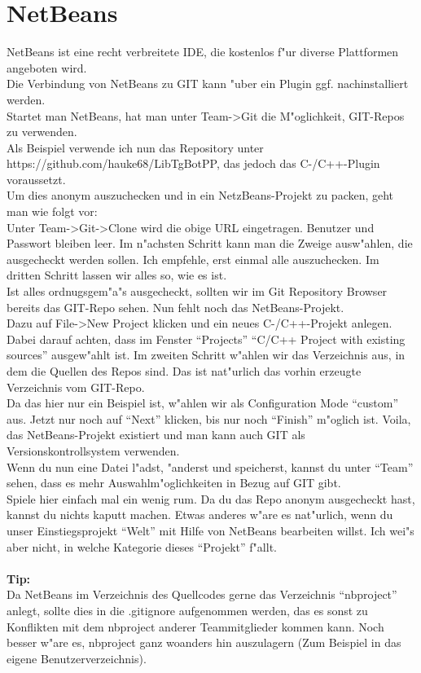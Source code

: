 \documentclass[german,a4paper]{report}
\begin{document}
\section{NetBeans}
NetBeans ist eine recht verbreitete IDE, die kostenlos f"ur diverse
Plattformen angeboten wird.\\
Die Verbindung von NetBeans zu GIT kann "uber ein Plugin ggf.
nachinstalliert werden.\\
Startet man NetBeans, hat man unter Team->Git die M"oglichkeit,
GIT-Repos zu verwenden.\\
Als Beispiel verwende ich nun das Repository unter
https://github.com/hauke68/LibTgBotPP, das jedoch das C-/C++-Plugin
voraussetzt.\\
Um dies anonym auszuchecken und in ein NetzBeans-Projekt zu packen,
geht man wie folgt vor:\\
Unter Team->Git->Clone wird die obige URL eingetragen. Benutzer
und Passwort bleiben leer. Im n"achsten Schritt kann man die
Zweige ausw"ahlen, die ausgecheckt werden sollen. Ich empfehle,
erst einmal alle auszuchecken. Im dritten Schritt lassen wir alles
so, wie es ist.\\
Ist alles ordnugsgem"a"s ausgecheckt, sollten wir im Git Repository
Browser bereits das GIT-Repo sehen. Nun fehlt noch das NetBeans-Projekt.\\
Dazu auf File->New Project klicken und ein neues C-/C++-Projekt anlegen.
Dabei darauf achten, dass im Fenster ``Projects'' ``C/C++ Project with
existing sources'' ausgew"ahlt ist. Im zweiten Schritt w"ahlen wir
das Verzeichnis aus, in dem die Quellen des Repos sind. Das ist nat"urlich
das vorhin erzeugte Verzeichnis vom GIT-Repo.\\
Da das hier nur ein Beispiel ist, w"ahlen wir als Configuration Mode
``custom'' aus. Jetzt nur noch auf ``Next'' klicken, bis nur noch
``Finish'' m"oglich ist. Voila, das NetBeans-Projekt existiert und
man kann auch GIT als Versionskontrollsystem verwenden.\\
Wenn du nun eine Datei l"adst, "anderst und speicherst, kannst du
unter ``Team'' sehen, dass es mehr Auswahlm"oglichkeiten in Bezug
auf GIT gibt.\\
Spiele hier einfach mal ein wenig rum. Da du das Repo anonym
ausgecheckt hast, kannst du nichts kaputt machen. Etwas anderes
w"are es nat"urlich, wenn du unser Einstiegsprojekt ``Welt'' mit
Hilfe von NetBeans bearbeiten willst. Ich wei"s aber nicht, in
welche Kategorie dieses ``Projekt'' f"allt.\\
\\
\textbf{Tip:}\\
Da NetBeans im Verzeichnis des Quellcodes gerne das Verzeichnis ``nbproject''
anlegt, sollte dies in die .gitignore aufgenommen werden, das es sonst
zu Konflikten mit dem nbproject anderer Teammitglieder kommen kann.
Noch besser w"are es, nbproject ganz woanders hin auszulagern (Zum
Beispiel in das eigene Benutzerverzeichnis).
\end{document}
